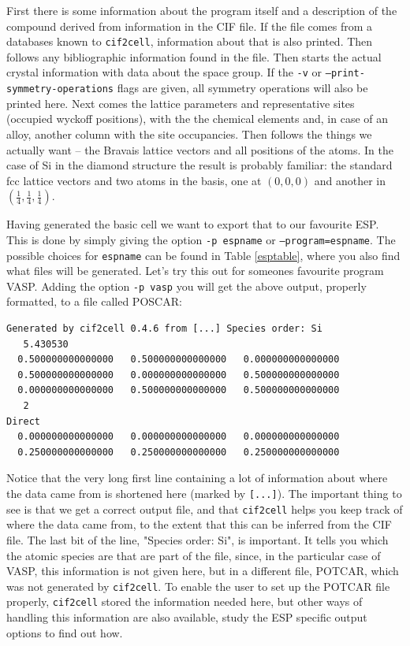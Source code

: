 \documentclass[11pt]{article}
\newcommand{\ciftocell}{\texttt{cif2cell}}
\begin{document}
\newpage
First there is some information about the program itself and a description of the compound derived from information in the CIF file. If the file comes from a databases known to \ciftocell, information about that is also printed. Then follows any bibliographic information found in the file. Then starts the actual crystal information with data about the space group. If the \texttt{-v} or \texttt{--print-symmetry-operations} flags are given, all symmetry operations will also be printed here. Next comes the lattice parameters and representative sites (occupied wyckoff positions), with the the chemical elements and, in case of an alloy, another column with the site occupancies. Then follows the things we actually want -- the Bravais lattice vectors and all positions of the atoms.  In the case of Si in the diamond structure the result is probably familiar:  the standard fcc lattice vectors and two atoms in the basis, one at $(0,0,0)$ and another in $(\frac{1}{4},\frac{1}{4},\frac{1}{4})$. 

Having generated the basic cell we want to export that to our favourite ESP. This is done by simply giving the option \texttt{-p espname} or \texttt{--program=espname}. The possible choices for \texttt{espname} can be found in Table \ref{esptable}, where you also find what files will be generated. Let's try this out for someones favourite program VASP. Adding the option \texttt{-p vasp} you will get the above output, properly formatted, to a file called POSCAR:
\begin{verbatim}
Generated by cif2cell 0.4.6 from [...] Species order: Si 
   5.430530
  0.500000000000000   0.500000000000000   0.000000000000000
  0.500000000000000   0.000000000000000   0.500000000000000
  0.000000000000000   0.500000000000000   0.500000000000000
   2
Direct
  0.000000000000000   0.000000000000000   0.000000000000000 
  0.250000000000000   0.250000000000000   0.250000000000000 
\end{verbatim}
Notice that the very long first line containing a lot of information about where the data came from is shortened here (marked by \texttt{[...]}). The important thing to see is that we get a correct output file, and that \ciftocell{} helps you keep track of where the data came from, to the extent that this can be inferred from the CIF file. The last bit of the line,  "Species order: Si", is important. It tells you which the atomic species are that are part of the file, since, in the particular case of VASP, this information is not given here, but in a different file, POTCAR, which was not generated by \ciftocell{}. To enable the user to set up the POTCAR file properly, \ciftocell{} stored the information needed here, but other ways of handling this information are also available, study the ESP specific output options to find out how.
\end{document}
